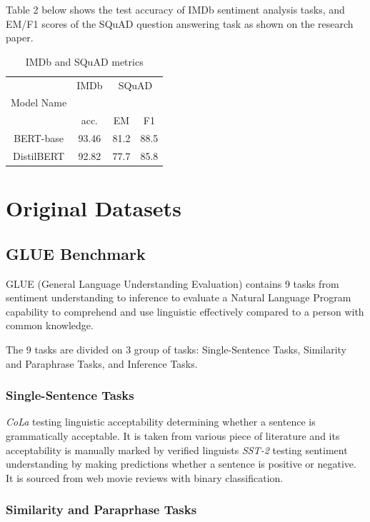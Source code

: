 \documentclass[
  11pt,
]{article}
\begin{document}
Table 2 below shows the test accuracy of IMDb sentiment analysis tasks,
and EM/F1 scores of the SQuAD question answering task as shown on the
research paper.

\begin{longtable}[t]{cccc}
\caption{\label{tab:table2}IMDb and SQuAD metrics}\\
\toprule
\multicolumn{1}{c}{ } & \multicolumn{1}{c}{IMDb} & \multicolumn{2}{c}{SQuAD} \\
\cmidrule(l{3pt}r{3pt}){2-2} \cmidrule(l{3pt}r{3pt}){3-4}
Model Name &  &  & \\
\midrule
 & acc. & EM & F1\\
BERT-base & 93.46 & 81.2 & 88.5\\
DistilBERT & 92.82 & 77.7 & 85.8\\
\bottomrule
\end{longtable}

\section{Original Datasets}\label{original-datasets}

\subsection{GLUE Benchmark}\label{glue-benchmark}

GLUE (General Language Understanding Evaluation) contains 9 tasks from
sentiment understanding to inference to evaluate a Natural Language
Program capability to comprehend and use linguistic effectively compared
to a person with common knowledge.

The 9 tasks are divided on 3 group of tasks: Single-Sentence Tasks,
Similarity and Paraphrase Tasks, and Inference Tasks.

\subsubsection{Single-Sentence Tasks}\label{single-sentence-tasks}

\emph{CoLa} testing linguistic acceptability determining whether a
sentence is grammatically acceptable. It is taken from various piece of
literature and its acceptability is manually marked by verified
linguists \emph{SST-2} testing sentiment understanding by making
predictions whether a sentence is positive or negative. It is sourced
from web movie reviews with binary classification.

\subsubsection{Similarity and Paraprhase
Tasks}\label{similarity-and-paraprhase-tasks}
\end{document}
